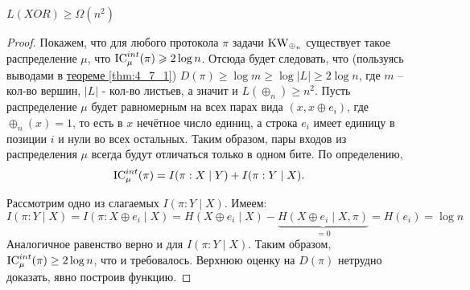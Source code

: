 \begin{thm}[Храпченко]
	$ L( XOR) \ge \Omega (n^2)$
\end{thm}
\begin{proof}
           Покажем, что для любого протокола $ \pi $ задачи $ \operatorname{KW}_{\oplus_n} $ существует такое распределение $\mu$, что $ \operatorname{IC}^{int}_{\mu}(\pi) \geqslant 2\log n$. Отсюда будет следовать, что (пользуясь выводами в \hyperref[thm:4_7_1]{теореме \ref{thm:4_7_1}}) $ D(\pi) \ge \log{m} \ge \log{|L|} \ge 2\log n$, где $m$ -- кол-во вершин, $|L|$ - кол-во листьев, а значит и $L(\oplus_n) \ge n^2 $. 
       Пусть распределение $ \mu $ будет равномерным на всех парах вида $ (x,x\oplus e_i)$, где $\oplus_n(x) = 1$, то есть в $ x $ нечётное число единиц, а строка $e_i$ имеет единицу в позиции $i$ и нули во всех остальных. Таким образом, пары входов из распределения $\mu$ всегда будут отличаться только в одном бите. По определению,
    $$ \operatorname{IC}^{int}_{\mu}(\pi) = I(\pi : X \mid Y) + I(\pi : Y \mid X). $$
    
    Рассмотрим одно из слагаемых $I(\pi : Y \mid X) $. Имеем:
    $$
    I(\pi : Y \mid X) = I(\pi : X \oplus e_i \mid X) = H(X \oplus e_i \mid X) - \underbrace{H(X\oplus e_i \mid X, \pi)}_{=0} = H(e_i) = \log n
    $$
    Аналогичное равенство верно и для $ I(\pi \colon Y\mid X) $. Таким образом, $\operatorname{IC}^{int}_{\mu}(\pi) \geq 2\log n $, что и требовалось. Верхнюю оценку на $ D(\pi) $ нетрудно доказать, явно построив функцию.
\end{proof}
\vspace{1em}
